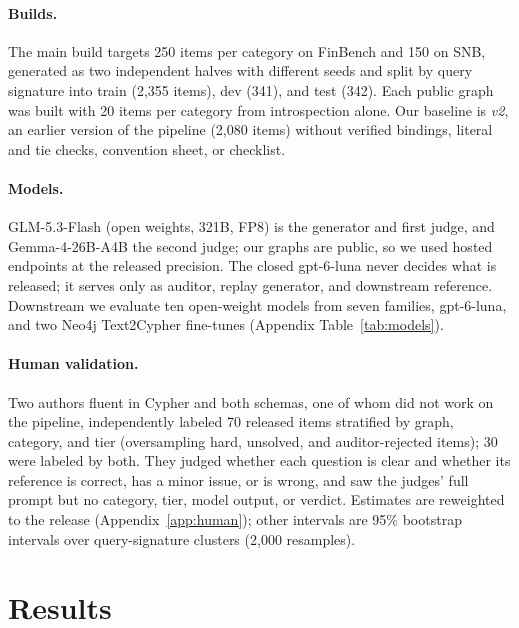 \documentclass[11pt]{article}
\begin{document}
\paragraph{Builds.} The main build targets 250 items per category on FinBench and 150 on SNB, generated as two independent halves with different seeds and split by query signature into train (2,355 items), dev (341), and test (342). Each public graph was built with 20 items per category from introspection alone. Our baseline is \emph{v2}, an earlier version of the pipeline (2,080 items) without verified bindings, literal and tie checks, convention sheet, or checklist.

\paragraph{Models.} GLM-5.3-Flash (open weights, 321B, FP8) is the generator and first judge, and Gemma-4-26B-A4B the second judge; our graphs are public, so we used hosted endpoints at the released precision. The closed gpt-6-luna never decides what is released; it serves only as auditor, replay generator, and downstream reference. Downstream we evaluate ten open-weight models from seven families, gpt-6-luna, and two Neo4j Text2Cypher fine-tunes (Appendix Table~\ref{tab:models}).

\paragraph{Human validation.} Two authors fluent in Cypher and both schemas, one of whom did not work on the pipeline, independently labeled 70 released items stratified by graph, category, and tier (oversampling hard, unsolved, and auditor-rejected items); 30 were labeled by both. They judged whether each question is clear and whether its reference is correct, has a minor issue, or is wrong, and saw the judges' full prompt but no category, tier, model output, or verdict. Estimates are reweighted to the release (Appendix~\ref{app:human}); other intervals are 95\% bootstrap intervals over query-signature clusters (2,000 resamples).

\section{Results}
\end{document}
